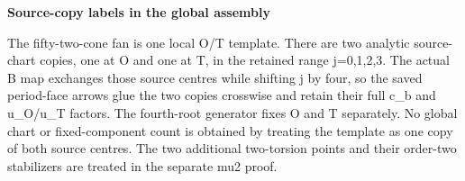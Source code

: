 \par

\medskip\noindent\textbf{Source-copy labels in the global assembly}

\par\nobreak

The fifty-two-cone fan is one local O/T template. There are two analytic source-chart copies, one at O and one at T, in the retained range j=0,1,2,3. The actual B map exchanges those source centres while shifting j by four, so the saved period-face arrows glue the two copies crosswise and retain their full c\_b and u\_O/u\_T factors. The fourth-root generator fixes O and T separately. No global chart or fixed-component count is obtained by treating the template as one copy of both source centres. The two additional two-torsion points and their order-two stabilizers are treated in the separate mu2 proof.


